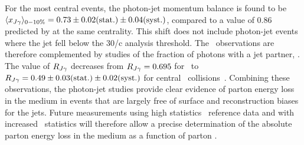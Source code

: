 For the most central events, the  photon-jet momentum balance  is found to be
$\langle x_{J\gamma}\rangle_{0-10\%} = 0.73 \pm 0.02 \mbox{(stat.)} \pm 0.04 \mbox{(syst.)}$, compared
to a value of 0.86 predicted by \PYTHYD{} at the same centrality. This shift does
not include photon-jet events where the jet fell below the 30\GeV/c analysis threshold.
The \xjg\ observations are therefore complemented by studies of the fraction of
photons with a jet partner, \rjg.  The value of $R_{J\gamma}$ decreases
from $R_{J\gamma} = 0.695$ for \PYTHYD\
to  $R_{J\gamma} = 0.49\pm 0.03\mbox{(stat.)}\pm 0.02\mbox{(syst.)}$ for
central \PbPb\ collisions~\cite{Chatrchyan:2012gt}. Combining these observations, the photon-jet studies
provide clear evidence of parton energy loss in the medium in events that are
largely free of surface and reconstruction biases for the jets. Future measurements
using high statistics \pp\ reference data and with increased \PbPb\ statistics will
therefore allow a precise determination of the absolute parton energy loss
in the medium as a function of parton \pT.

